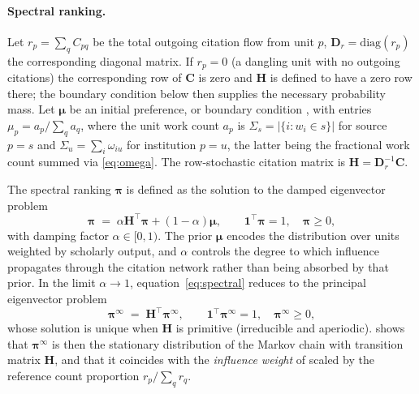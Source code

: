 \paragraph{Spectral ranking.}
Let $r_p=\sum_q C_{pq}$ be the total outgoing citation flow from unit $p$,
$\mathbf{D}_r=\mathrm{diag}(r_p)$ the corresponding diagonal matrix.
If $r_p=0$ (a dangling unit with no outgoing citations) the corresponding
row of $\mathbf{C}$ is zero and $\mathbf{H}$ is defined to have a zero row
there; the boundary condition below then supplies the necessary probability
mass.
Let $\boldsymbol{\mu}$ be an initial preference, or boundary condition
\citep{hubbellInputoutputApproachClique1965, vignaSpectralRanking2016},
with entries $\mu_p = a_p / \sum_q a_q$,
where the unit work count $a_p$ is
$\Sigma_s = |\{i : w_i \in s\}|$ for source $p=s$
and
$\Sigma_u = \sum_i \omega_{iu}$ for institution $p=u$,
the latter being the fractional work count summed via \eqref{eq:omega}.
The row-stochastic citation matrix is
$\mathbf{H}=\mathbf{D}_r^{-1}\mathbf{C}$.

The spectral ranking $\boldsymbol{\pi}$
\citep[see][for an overview]{vignaSpectralRanking2016}
is defined as the solution to the damped eigenvector problem
\begin{equation}
    \boldsymbol{\pi}
    \;=\;
    \alpha\mathbf{H}^\top\boldsymbol{\pi}
    +(1-\alpha)\boldsymbol{\mu},
    \qquad
    \mathbf{1}^\top\boldsymbol{\pi}=1,
    \quad
    \boldsymbol{\pi}\ge 0,
    \label{eq:spectral}
\end{equation}
with damping factor $\alpha\in[0,1)$.
The prior $\boldsymbol{\mu}$ encodes the distribution over
units weighted by scholarly output, and $\alpha$ controls the degree to
which influence propagates through the citation network rather than
being absorbed by that prior.
In the limit $\alpha\to 1$, equation~\eqref{eq:spectral} reduces to the
principal eigenvector problem
\begin{equation}
    \boldsymbol{\pi}^{\infty}
    \;=\;
    \mathbf{H}^\top\boldsymbol{\pi}^{\infty},
    \qquad
    \mathbf{1}^\top\boldsymbol{\pi}^{\infty}=1,
    \quad
    \boldsymbol{\pi}^{\infty}\ge 0,
    \label{eq:eig}
\end{equation}
whose solution is unique when $\mathbf{H}$ is primitive (irreducible and
aperiodic). \cite{gellerCitationInfluenceMethodology1978} shows that
$\boldsymbol{\pi}^{\infty}$ is then the stationary distribution of the
Markov chain with transition matrix $\mathbf{H}$, and that it coincides
with the \textit{influence weight} of \cite{pinskiCitationInfluenceJournal1976}
scaled by the reference count proportion $r_p / \sum_q r_q$.


